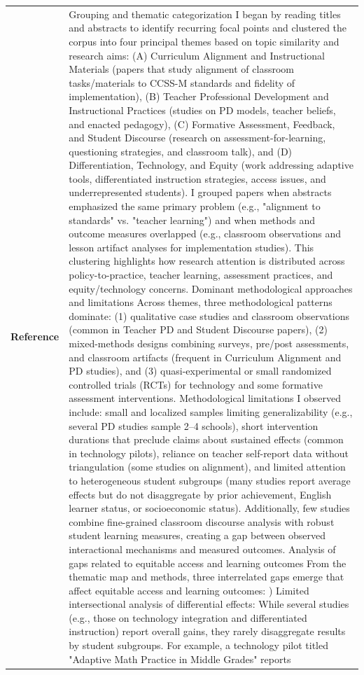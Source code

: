 \begin{longtable}{@{}l p{13cm}@{}}
  \textbf{Reference} & Grouping and thematic categorization \newline I began by reading titles and abstracts to identify recurring focal points and clustered the corpus into four principal themes based on topic similarity and research aims: (A) Curriculum Alignment and Instructional Materials (papers that study alignment of classroom tasks/materials to CCSS-M standards and fidelity of implementation), (B) Teacher Professional Development and Instructional Practices (studies on PD models, teacher beliefs, and enacted pedagogy), (C) Formative Assessment, Feedback, and Student Discourse (research on assessment-for-learning, questioning strategies, and classroom talk), and (D) Differentiation, Technology, and Equity (work addressing adaptive tools, differentiated instruction strategies, access issues, and underrepresented students). I grouped papers when abstracts emphasized the same primary problem (e.g., "alignment to standards" vs. "teacher learning") and when methods and outcome measures overlapped (e.g., classroom observations and lesson artifact analyses for implementation studies). This clustering highlights how research attention is distributed across policy-to-practice, teacher learning, assessment practices, and equity/technology concerns. \newline Dominant methodological approaches and limitations \newline Across themes, three methodological patterns dominate: (1) qualitative case studies and classroom observations (common in Teacher PD and Student Discourse papers), (2) mixed-methods designs combining surveys, pre/post assessments, and classroom artifacts (frequent in Curriculum Alignment and PD studies), and (3) quasi-experimental or small randomized controlled trials (RCTs) for technology and some formative assessment interventions. Methodological limitations I observed include: small and localized samples limiting generalizability (e.g., several PD studies sample 2--4 schools), short intervention durations that preclude claims about sustained effects (common in technology pilots), reliance on teacher self-report data without triangulation (some studies on alignment), and limited attention to heterogeneous student subgroups (many studies report average effects but do not disaggregate by prior achievement, English learner status, or socioeconomic status). Additionally, few studies combine fine-grained classroom discourse analysis with robust student learning measures, creating a gap between observed interactional mechanisms and measured outcomes. \newline Analysis of gaps related to equitable access and learning outcomes \newline From the thematic map and methods, three interrelated gaps emerge that affect equitable access and learning outcomes: \newline 1) Limited intersectional analysis of differential effects: While several studies (e.g., those on technology integration and differentiated instruction) report overall gains, they rarely disaggregate results by student subgroups. For example, a technology pilot titled "Adaptive Math Practice in Middle Grades" reports 
\end{longtable}
